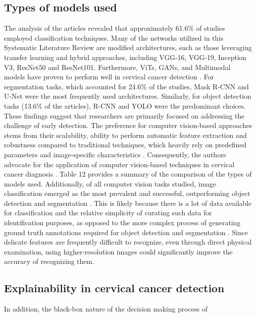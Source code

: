 \documentclass{svjour3}
\begin{document}
\subsection{Types of models used}
The analysis of the articles revealed that approximately 61.6\% of studies employed classification techniques. Many of the networks utilized in this Systematic Literature Review are modified architectures, such as those leveraging transfer learning and hybrid approaches, including VGG‑16, VGG‑19, Inception V3, ResNet50 and ResNet101. Furthermore, ViTs, GANs, and Multimodal models have proven to perform well in cervical cancer detection \cite{35,98,122}.
For segmentation tasks, which accounted for 24.6\% of the studies, Mask R‑CNN and U‑Net were the most frequently used architectures. Similarly, for object detection tasks (13.6\% of the articles), R‑CNN and YOLO were the predominant choices. These findings suggest that researchers are primarily focused on addressing the challenge of early detection. The preference for computer vision‑based approaches stems from their scalability, ability to perform automatic feature extraction and robustness \cite{64} compared to traditional techniques, which heavily rely on predefined parameters and image‑specific characteristics \cite{19}. Consequently, the authors advocate for the application of computer vision‑based techniques in cervical cancer diagnosis \cite{18}. Table 12 provides a summary of the comparison of the types of models used.
Additionally, of all computer vision tasks studied, image classification emerged as the most prevalent and successful, outperforming object detection and segmentation \cite{42,43,60}. This is likely because there is a lot of data available for classification and the relative simplicity of curating such data for identification purposes, as opposed to the more complex process of generating ground truth annotations required for object detection and segmentation \cite{6,17,18,19}. Since delicate features are frequently difficult to recognize, even through direct physical examination, using higher‑resolution images could significantly improve the accuracy of recognizing them.
\subsection{Explainability in cervical cancer detection}
In addition, the black‑box nature of the decision making process of
\end{document}
